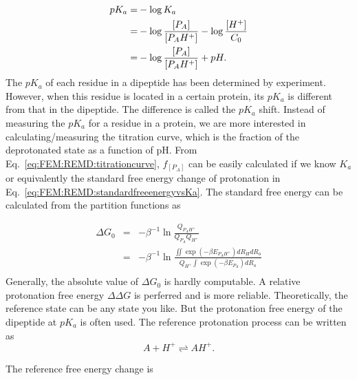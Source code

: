 \begin{align}
	pK_{a}  = & -\log{K_{a}}\notag\\
	 = & -\log{\frac{\left[P_{A}\right]}{\left[P_{A}H^{+}\right]}}-\log{\frac{\left[H^{+}\right]}{C_{0}}}\notag\\
	 = & -\log{\frac{\left[P_{A}\right]}{\left[P_{A}H^{+}\right]}}+pH.
	 \label{eq:FEM:REMD:pKa}
\end{align}
The $pK_{a}$ of each residue in a dipeptide has been determined by
experiment. However, when this residue is located in a certain protein,
its $pK_{a}$ is different from that in the dipeptide. The difference
is called the $pK_{a}$ shift. Instead of measuring the $pK_{a}$
for a residue in a protein, we are more interested in calculating/measuring
the titration curve, which is the fraction of the deprotonated state
as a function of pH. From Eq.~\ref{eq:FEM:REMD:titrationcurve}, $f_{\left[P_{A}\right]}$
can be easily calculated if we know $K_{a}$ or equivalently the standard
free energy change of protonation in Eq.~\ref{eq:FEM:REMD:standardfreeenergyvsKa}.
The standard free energy can be calculated from the partition functions
as

\begin{eqnarray*}
	\Delta G_{0} & = & -\beta^{-1}\ln\frac{Q_{P_{A}H^{+}}}{Q_{P_{A}}Q_{H^{+}}}\\
	& = & -\beta^{-1}\ln\frac{\iint\exp(-\beta E_{P_{A}H^{+}})dR_{H}dR_{o}}{Q_{H^{+}}\int\exp(-\beta E_{P_{A}})dR_{o}}\\
\end{eqnarray*}
Generally, the absolute value of $\Delta G_{0}$ is hardly computable.
A relative protonation free energy $\Delta\Delta G$ is perferred
and is more reliable. Theoretically, the reference state can be any
state you like. But the protonation free energy of the dipeptide at
$pK_{a}$ is often used. The reference protonation process can be
written as
\[
A+H^{+}\rightleftharpoons AH^{+}.
\]

The reference free energy change is 

